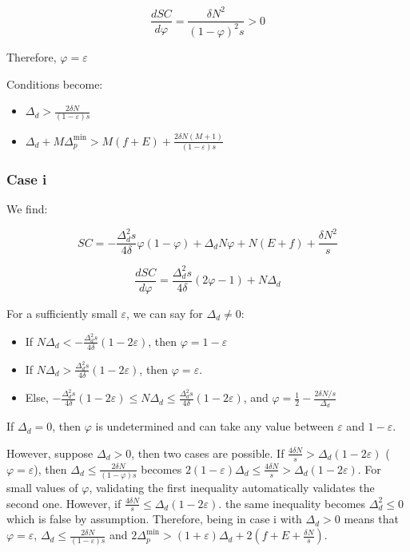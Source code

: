 \documentclass[english, a4paper]{article}
\theoremstyle{plain}
\theoremstyle{definition}
\theoremstyle{remark}
\begin{document}
    \[
    \frac{dSC}{d\varphi} = \frac{\delta N^2}{(1 - \varphi)^2 s} > 0
    \]

    Therefore, $\varphi = \varepsilon$

    Conditions become:
    \begin{itemize}
        \item $\Delta_d > \frac{2 \delta N}{(1 - \varepsilon) s}$
        \item $\Delta_d + M\Delta_p^{\text{min}} > M(f + E) + \frac{2 \delta N(M+1)}{(1 - \varepsilon) s}$
    \end{itemize}

    \subsubsection{Case i}

    We find:

    \[
    SC = -\frac{\Delta_d^2 s}{4 \delta}\varphi(1 - \varphi) + \Delta_d N\varphi + N(E + f) + \frac{\delta N^2}{s}
    \]

    \[
    \frac{dSC}{d\varphi} = \frac{\Delta_d^2 s}{4\delta}(2\varphi - 1) + N\Delta_d
    \]

    For a sufficiently small $\varepsilon$, we can say for $\Delta_d \neq 0$:

    \begin{itemize}
        \item If $N\Delta_d < -\frac{\Delta_d^2 s}{4\delta} (1 - 2\varepsilon)$, then $\varphi = 1 - \varepsilon$
        \item If $N\Delta_d > \frac{\Delta_d^2 s}{4\delta} (1 - 2 \varepsilon)$, then $\varphi = \varepsilon$.
        \item Else, $- \frac{\Delta_d^2 s}{4\delta}(1 - 2 \varepsilon) \leq N\Delta_d \leq \frac{\Delta_d^2 s}{4\delta} (1 - 2\varepsilon)$, and $\varphi = \frac{1}{2} - \frac{2\delta N / s}{\Delta_d}$
    \end{itemize}

    If $\Delta_d = 0$, then $\varphi$ is undetermined and can take any value between $\varepsilon$ and $1 - \varepsilon$.

    However, suppose $\Delta_d > 0$, then two cases are possible. If $\frac{4\delta N}{s} > \Delta_d (1 - 2\varepsilon)$ ($\varphi = \varepsilon$), then $\Delta_d \leq \frac{2\delta N}{(1 - \varphi) s}$ becomes $2(1 - \varepsilon)\Delta_d \leq \frac{4\delta N}{s} > \Delta_d (1 - 2\varepsilon)$. For small values of $\varphi$, validating the first inequality automatically validates the second one. However, if $\frac{4\delta N}{s} \leq \Delta_d (1 - 2\varepsilon)$. the same inequality becomes $\Delta_d^2 \leq 0$ which is false by assumption. Therefore, being in case i with $\Delta_d > 0$ means that $\varphi = \varepsilon$, $\Delta_d \leq \frac{2\delta N}{(1 - \varepsilon) s}$ and $2\Delta_p^{\text{min}} > (1 + \varepsilon)\Delta_d + 2(f + E + \frac{\delta N}{s})$.
\end{document}
